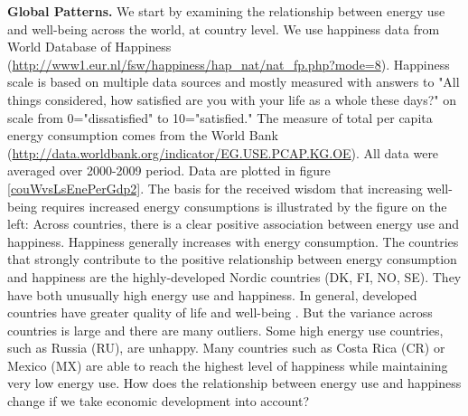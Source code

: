 \documentclass[10pt, letterpaper]{article}
\begin{document}
\begin{spacing}{1.5}
\textbf{Global Patterns.} We start by examining the relationship between energy
use and well-being across the world, at country level.  %
We use happiness data from World Database of Happiness
(\url{http://www1.eur.nl/fsw/happiness/hap_nat/nat_fp.php?mode=8}). 
  Happiness scale is based on multiple data sources and mostly measured with answers to
"All things considered, how satisfied are you with your life as a whole these
days?" on scale from 0="dissatisfied" to 10="satisfied." 
The measure of total per capita energy consumption comes from the World Bank
(\url{http://data.worldbank.org/indicator/EG.USE.PCAP.KG.OE}). All data were
averaged over 2000-2009 period. Data are plotted in figure \ref{couWvsLsEnePerGdp2}.
% 
%
 The basis for the received wisdom that increasing well-being requires increased
energy consumptions is illustrated by the figure on the left: Across countries,
there is a clear positive association between energy use and
happiness. Happiness generally increases with energy consumption. The  countries that strongly contribute to the positive
relationship between energy consumption and happiness are the highly-developed
Nordic countries (DK, FI, NO, SE). They have both unusually high energy use and
happiness. In general, developed countries have greater quality of life and
well-being \citep{mazur11, jorgenson14C}.
 But the variance across
countries is large and there are many outliers. Some high energy use countries, such as
Russia (RU),  are unhappy. Many countries such as Costa
Rica (CR) or  Mexico (MX) are able to reach the highest level of happiness while maintaining very low energy use. 
%
%
%
 How does the relationship between
energy use and happiness change if we take economic development into account?
%


\end{spacing}
\end{document}
